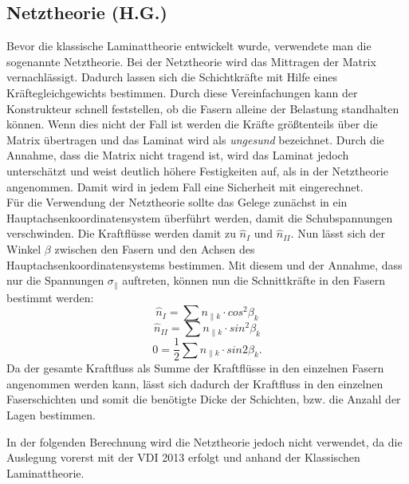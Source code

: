 \subsection{Netztheorie (H.G.)}
Bevor die klassische Laminattheorie entwickelt wurde, verwendete man die sogenannte Netztheorie. 
Bei der Netztheorie wird das Mittragen der Matrix vernachlässigt. Dadurch lassen sich die Schichtkräfte mit Hilfe eines Kräftegleichgewichts bestimmen. 
Durch diese Vereinfachungen kann der Konstrukteur schnell feststellen, ob die Fasern alleine der Belastung standhalten können. Wenn dies nicht der Fall ist werden die Kräfte größtenteils über die Matrix übertragen und das Laminat wird als \textit{ungesund} bezeichnet. Durch die Annahme, dass die Matrix nicht tragend ist, wird das Laminat jedoch unterschätzt und weist deutlich höhere Festigkeiten auf, als in der Netztheorie angenommen. Damit wird in jedem Fall eine Sicherheit mit eingerechnet.\\
Für die Verwendung der Netztheorie sollte das Gelege zunächst in ein Hauptachsenkoordinatensystem überführt werden, damit die Schubspannungen verschwinden. Die Kraftflüsse werden damit zu $\hat{n}_{I}$ und $\hat{n}_{II}$. Nun lässt sich der Winkel $\beta $ zwischen den Fasern und den Achsen des Hauptachsenkoordinatensystems bestimmen. Mit diesem und der Annahme, dass nur die Spannungen $\sigma_{\|}$ auftreten, können nun die Schnittkräfte in den Fasern bestimmt werden:
\begin{equation}
\hat{n}_{I}=\sum n_{\|k}\cdot cos^2\beta_{k}
\end{equation}
\begin{equation}
\hat{n}_{II}=\sum n_{\|k}\cdot sin^2\beta_{k}
\end{equation}
\begin{equation}
0=\frac{1}{2}\sum n_{\|k}\cdot sin2\beta_{k}.
\end{equation}
Da der gesamte Kraftfluss als Summe der Kraftflüsse in den einzelnen Fasern angenommen werden kann, lässt sich dadurch der Kraftfluss in den einzelnen Faserschichten und somit die benötigte Dicke der Schichten, bzw. die Anzahl der Lagen bestimmen\cite{item3}.

\noindent In der folgenden Berechnung wird die Netztheorie jedoch nicht verwendet, da die Auslegung vorerst mit der VDI 2013 erfolgt und anhand der Klassischen Laminattheorie.
\newpage

